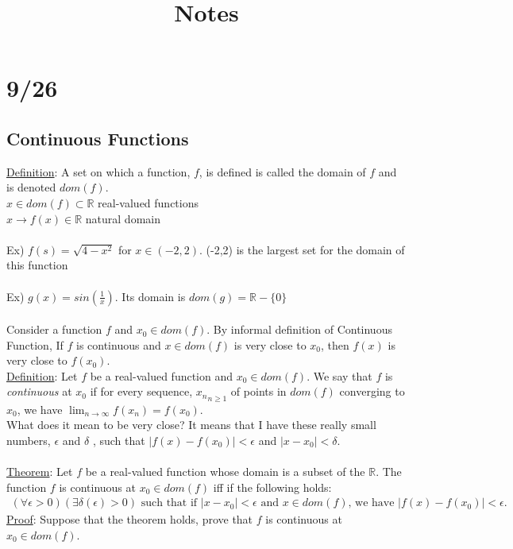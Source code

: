 \documentclass[11pt]{article}
\title{Notes}
\begin{document}
\maketitle

\section*{9/26}
	\subsection*{Continuous Functions}
	\underline{Definition}: A set on which a function, $f$, is defined is called the domain of $f$ and is denoted $dom(f)$.\\
	$x \in dom(f) \subset \mathbb{R}$ real-valued functions\\
	$x \to f(x) \in \mathbb{R}$ natural domain\\\\
	Ex) $f(s) = \sqrt{4 - x^2}$ for $x \in (-2, 2)$. (-2,2) is the largest set for the domain of this function\\\\
	Ex) $g(x) = sin(\frac{1}{x})$. Its domain is $dom(g) = \mathbb{R} - \{0\}$\\\\
	Consider a function $f$ and $x_0 \in dom(f)$. By informal definition of Continuous Function, If $f$ is continuous and $x \in dom(f)$ is very close to $x_0$, then $f(x)$ is very close to $f(x_0)$.\\
	\underline{Definition}: Let $f$ be a real-valued function and $x_0 \in dom(f)$. We say that $f$ is \emph{continuous} at $x_0$ if for every sequence, ${x_n}_{n \ge 1}$ of points in $dom(f)$ converging to $x_0$, we have $\lim_{n \to \infty}{f(x_n)} = f(x_0)$.\\
	What does it mean to be very close? It means that I have these really small numbers, $\epsilon$ and $\delta$ , such that $|f(x) - f(x_0)| < \epsilon$ and $|x - x_0| < \delta$.\\\\
	\underline{Theorem}: Let $f$ be a real-valued function whose domain is a
	subset of the $\mathbb{R}$. The function $f$ is continuous at $x_0 \in dom(f)$ iff if the following holds:\\
	\begin{eqnarray}
		(\forall \epsilon > 0)(\exists \delta(\epsilon) > 0) \text{ such that if } |x - x_0| < \epsilon \text{ and } x \in dom(f) \text{, we have } |f(x) - f(x_0)| < \epsilon.
	\end{eqnarray}
	\underline{Proof}: Suppose that the theorem holds, prove that $f$ is continuous at $x_0 \in dom(f)$.
\end{document}
